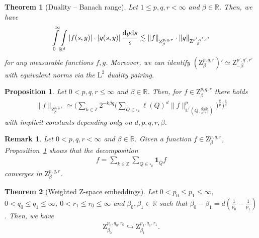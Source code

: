 \documentclass[10pt,a4paper]{amsart}
\newtheorem{theorem}{Theorem}
\newtheorem{proposition}{Proposition}
\newtheorem{remark}{Remark}
\newcommand{\IR}{\mathbb{R}}
\newcommand{\IZ}{\mathbb{Z}}
\renewcommand{\L}{\mathrm{L}}
\newcommand{\Z}{\mathrm{Z}}
\renewcommand{\d}{\mathrm{d}}
\begin{document}
\begin{theorem}[Duality -- Banach range]
\label{thm: duality banach range}
    Let $1\leq p,q,r<\infty$ and $\beta\in \IR$. Then, we have
    \begin{align*}
        \int\limits_0^\infty \int\limits_{\IR^d} |f(s,y)| \cdot |g(s,y)| \,\frac{\d y \d s}{s} \lesssim  \|f\|_{\Z^{\vphantom{p',q',r'}p,q,r}_{\beta} } \cdot \|g\|_{\Z^{p',q',r'}_{-\beta} }
    \end{align*}
    for any measurable functions $f,g$. Moreover, we can identify $(\Z^{p,q,r}_\beta)' \simeq \Z^{p',q',r'}_{-\beta}$ with equivalent norms via the $\L^2$ duality pairing.
\end{theorem}

\begin{proposition}
\label{prop: dyadic char}
    Let $0<p,q,r\leq \infty$ and $\beta\in \IR$. Then, for $f \in \Z^{p,q,r}_\beta$ there holds
    \begin{align*}
        \|f\|_{\Z^{p,q,r}_\beta} \simeq \Big( \sum\limits_{k\in\IZ} 2^{-k\beta q} \Big(\sum\limits_{Q\in \square_k} \ell(Q)^d \|f\|_{\L^r(\bar Q , \frac{\d y \d s}{s^{d+1}})}^p \Big)^\frac{q}{p} \Big)^\frac{1}{q}
    \end{align*}
    with implicit constants depending only on $d,p,q,r,\beta$.
\end{proposition}

\begin{remark}
\label{rem: trivial dyadic decomp}
    Let $0<p,q,r< \infty$ and $\beta\in\IR$. Given a function $f\in \Z^{p,q,r}_\beta$, Proposition~\ref{prop: dyadic char} shows that the decomposition
    \begin{align*}
        f = \sum\limits_{k\in\IZ} \sum\limits_{Q\in\square_k} \mathbf{1}_{\bar Q}f
    \end{align*}
    converges in $\Z^{p,q,r}_\beta$.
\end{remark}

\begin{theorem}[Weighted $\Z$-space embeddings]
\label{thm: weigthed embedding}
    Let $0<p_0\leq p_1\leq \infty$, $0<q_0\leq q_1\leq \infty$,  $0<r_1\leq r_0\leq \infty$ and $\beta_0,\beta_1\in \IR$ such that $\beta_0-\beta_1 = d(\frac{1}{p_0}-\frac{1}{p_1})$. Then, we have
    \begin{align*}
        \Z^{p_0,q_0,r_0}_{\beta_0} \hookrightarrow \Z^{p_1,q_1,r_1}_{\beta_1}.
    \end{align*}
\end{theorem}
\end{document}
